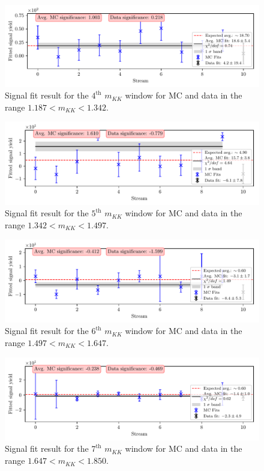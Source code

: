 \begin{figure}[H]
	\centering
	\captionsetup{width=0.8\linewidth}
	\includegraphics[width=\linewidth]{fig/sig_mKK_4}
	\caption{Signal fit result for the $4^{\mathrm{th}}$ $m_{KK}$ window for MC and data in the range $1.187  < m_{KK} < 1.342$.}
\end{figure}

\begin{figure}[H]
	\centering
	\captionsetup{width=0.8\linewidth}
	\includegraphics[width=\linewidth]{fig/sig_mKK_5}
	\caption{Signal fit result for the $5^{\mathrm{th}}$ $m_{KK}$ window for MC and data in the range $1.342  < m_{KK} < 1.497$.}
\end{figure}

\begin{figure}[H]
	\centering
	\captionsetup{width=0.8\linewidth}
	\includegraphics[width=\linewidth]{fig/sig_mKK_6}
	\caption{Signal fit result for the $6^{\mathrm{th}}$ $m_{KK}$ window for MC and data in the range $1.497  < m_{KK} < 1.647$.}
\end{figure}

\begin{figure}[H]
	\centering
	\captionsetup{width=0.8\linewidth}
	\includegraphics[width=\linewidth]{fig/sig_mKK_7}
	\caption{Signal fit result for the $7^{\mathrm{th}}$ $m_{KK}$ window for MC and data in the range $1.647  < m_{KK} < 1.850$.}
\end{figure}

